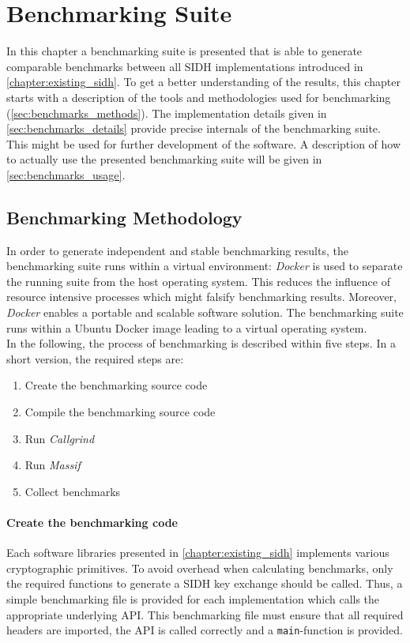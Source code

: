 \chapter{Benchmarking Suite}\label{chapter:benchmarking_suite}
In this chapter a benchmarking suite is presented that is able to generate comparable benchmarks between all SIDH implementations introduced in \autoref{chapter:existing_sidh}. To get a better understanding of the results, this chapter starts with a  description of the tools and methodologies used for benchmarking (\autoref{sec:benchmarks_methods}). The implementation details given in \autoref{sec:benchmarks_details} provide precise internals of the benchmarking suite. This might be used for further development of the software. A description of how to actually use the presented benchmarking suite will be given in \autoref{sec:benchmarks_usage}.

\section{Benchmarking Methodology}\label{sec:benchmarks_methods}
In order to generate independent and stable benchmarking results, the benchmarking suite runs within a virtual environment: \textit{Docker} is used to separate the running suite from the host operating system. This reduces the influence of resource intensive processes which might falsify benchmarking results. Moreover, \textit{Docker} enables a portable and scalable software solution. The benchmarking suite runs within a Ubuntu Docker image leading to a virtual operating system.
\\
In the following, the process of benchmarking is described within five steps. In a short version, the required steps are:

\begin{enumerate}
  \itemsep0em 
  \item Create the benchmarking source code
  \item Compile the benchmarking source code
  \item Run \textit{Callgrind}
  \item Run \textit{Massif}
  \item Collect benchmarks
\end{enumerate}

\subsubsection{Create the benchmarking code}
Each software libraries presented in \autoref{chapter:existing_sidh} implements various cryptographic primitives. To avoid overhead when calculating benchmarks, only the required functions to generate a SIDH key exchange should be called. Thus, a simple benchmarking file is provided for each implementation which calls the appropriate underlying API. This benchmarking file must ensure that all required headers are imported, the API is called correctly and a \texttt{main}-function is provided.

